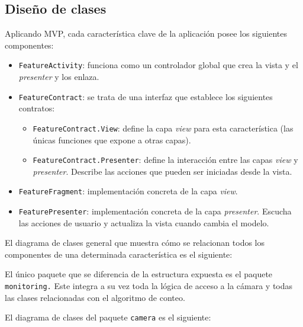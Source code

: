 \subsection{Diseño de clases}\label{diseno-de-clases}

Aplicando MVP, cada característica clave de la aplicación posee los
siguientes componentes:

\begin{itemize}
\tightlist
\item
  \texttt{FeatureActivity}: funciona como un controlador global que crea la vista
  y el \emph{presenter} y los enlaza.
\item
  \texttt{FeatureContract}: se trata de una interfaz que establece los siguientes
  contratos:

  \begin{itemize}
  \tightlist
  \item
    \texttt{FeatureContract.View}: define la capa \emph{view} para esta
    característica (las únicas funciones que expone a otras capas).
  \item
    \texttt{FeatureContract.Presenter}: define la interacción entre las capas
    \emph{view} y \emph{presenter}. Describe las acciones que pueden ser
    iniciadas desde la vista.
  \end{itemize}
\item
  \texttt{FeatureFragment}: implementación concreta de la capa \emph{view}.
\item
  \texttt{FeaturePresenter}: implementación concreta de la capa \emph{presenter}.
  Escucha las acciones de usuario y actualiza la vista cuando cambia el
  modelo.
\end{itemize}


El diagrama de clases general que muestra cómo se relacionan todos los
componentes de una determinada característica es el siguiente:


El único paquete que se diferencia de la estructura expuesta es el
paquete \texttt{monitoring.} Este integra a su vez toda la lógica de
acceso a la cámara y todas las clases relacionadas con el algoritmo de
conteo.


El diagrama de clases del paquete \texttt{camera} es el siguiente:

